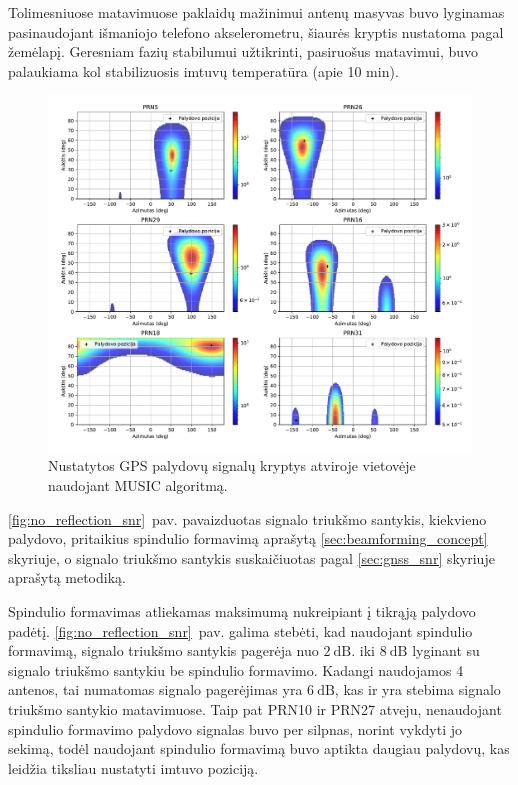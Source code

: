 \documentclass[main.tex]{subfiles}
\begin{document}
Tolimesniuose matavimuose paklaidų mažinimui antenų masyvas buvo lyginamas pa\-si\-nau\-do\-jant
išmaniojo telefono akselerometru, šiaurės kryptis nustatoma pagal žemėlapį.
Geresniam fazių stabilumui užtikrinti, pasiruošus matavimui, buvo palaukiama
kol stabilizuosis imtuvų temperatūra (apie 10 min).

\begin{figure}[ht]
    \begin{centering}
    \includegraphics[scale=0.55]{drawings/no_reflection}
    \par\end{centering}
    \protect\caption{\label{fig:no_reflection}Nustatytos GPS palydovų signalų kryptys atviroje vietovėje naudojant MUSIC algoritmą.}
\end{figure}

\ref{fig:no_reflection_snr}~pav. pavaizduotas signalo triukšmo santykis, kiekvieno palydovo,
pritaikius spindulio formavimą aprašytą \ref{sec:beamforming_concept} skyriuje, o
signalo triukšmo santykis suskaičiuotas pagal \ref{sec:gnss_snr} skyriuje aprašytą
metodiką.

Spindulio formavimas atliekamas maksimumą nukreipiant į tikrąją palydovo padėtį.
\ref{fig:no_reflection_snr}~pav. galima stebėti, kad naudojant spindulio formavimą,
signalo triukšmo santykis pagerėja nuo $2\ \mathrm{dB}$. iki $8\ \mathrm{dB}$ lyginant
su signalo triukšmo santykiu be spindulio formavimo.
Kadangi naudojamos 4 antenos, tai numatomas signalo pagerėjimas yra $6\ \mathrm{dB}$,
kas ir yra stebima signalo triukšmo santykio matavimuose. Taip pat PRN10 ir PRN27 atveju,
nenaudojant spindulio formavimo palydovo signalas buvo per silpnas, norint
vykdyti jo sekimą, todėl naudojant spindulio formavimą buvo aptikta
daugiau palydovų, kas leidžia tiksliau nustatyti imtuvo poziciją.
\end{document}
